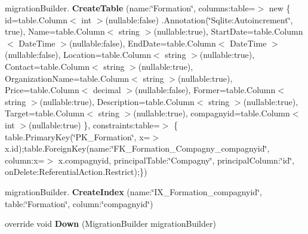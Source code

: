 \begin{DoxyCompactItemize}
migration\+Builder. {\bfseries Create\+Table} (name\+:\char`\"{}Formation\char`\"{}, columns\+:table=$>$ new \{ id=table.\+Column$<$ int $>$(nullable\+:false) .Annotation(\char`\"{}Sqlite\+:\+Autoincrement\char`\"{}, true), Name=table.\+Column$<$ string $>$(nullable\+:true), Start\+Date=table.\+Column$<$ Date\+Time $>$(nullable\+:false), End\+Date=table.\+Column$<$ Date\+Time $>$(nullable\+:false), Location=table.\+Column$<$ string $>$(nullable\+:true), Contact=table.\+Column$<$ string $>$(nullable\+:true), Organization\+Name=table.\+Column$<$ string $>$(nullable\+:true), Price=table.\+Column$<$ decimal $>$(nullable\+:false), Former=table.\+Column$<$ string $>$(nullable\+:true), Description=table.\+Column$<$ string $>$(nullable\+:true), Target=table.\+Column$<$ string $>$(nullable\+:true), compagnyid=table.\+Column$<$ int $>$(nullable\+:true) \}, constraints\+:table=$>$ \{ table.\+Primary\+Key(\char`\"{}P\+K\+\_\+\+Formation\char`\"{}, x=$>$ x.\+id);table.\+Foreign\+Key(name\+:\char`\"{}F\+K\+\_\+\+Formation\+\_\+\+Compagny\+\_\+compagnyid\char`\"{}, column\+:x=$>$ x.\+compagnyid, principal\+Table\+:\char`\"{}Compagny\char`\"{}, principal\+Column\+:\char`\"{}id\char`\"{}, on\+Delete\+:\+Referential\+Action.\+Restrict);\})
\item 
\mbox{\label{namespace_mediwatch_1_1_server_1_1_migrations_1_1_db_context_mediwatch_migrations_a94b5e0404f6fdcce0415ddbf071032f5}} 
migration\+Builder. {\bfseries Create\+Index} (name\+:\char`\"{}I\+X\+\_\+\+Formation\+\_\+compagnyid\char`\"{}, table\+:\char`\"{}Formation\char`\"{}, column\+:\char`\"{}compagnyid\char`\"{})
\item 
\mbox{\label{namespace_mediwatch_1_1_server_1_1_migrations_1_1_db_context_mediwatch_migrations_a5bd8200f6170a3c9e6e12f83b5291074}} 
override void {\bfseries Down} (Migration\+Builder migration\+Builder)
\end{DoxyCompactItemize}
